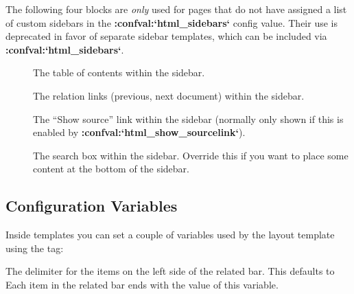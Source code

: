 \documentclass[letterpaper,10pt,english]{sphinxmanual}
\begin{document}
The following four blocks are \emph{only} used for pages that do not have assigned a
list of custom sidebars in the {\color{red}\bfseries{}:confval:{}`html\_sidebars{}`} config value.  Their use
is deprecated in favor of separate sidebar templates, which can be included via
{\color{red}\bfseries{}:confval:{}`html\_sidebars{}`}.
\begin{description}
\item[{}] \leavevmode
The table of contents within the sidebar.


\item[{}] \leavevmode
The relation links (previous, next document) within the sidebar.


\item[{}] \leavevmode
The ``Show source'' link within the sidebar (normally only shown if this is
enabled by {\color{red}\bfseries{}:confval:{}`html\_show\_sourcelink{}`}).


\item[{}] \leavevmode
The search box within the sidebar.  Override this if you want to place some
content at the bottom of the sidebar.


\end{description}


\subsection{Configuration Variables}
\label{templating:configuration-variables}
Inside templates you can set a couple of variables used by the layout template
using the  tag:

\begin{fulllineitems}
\label{templating:reldelim1}
The delimiter for the items on the left side of the related bar.  This
defaults to  Each item in the related bar ends with the value
of this variable.

\end{fulllineitems}

\end{document}
